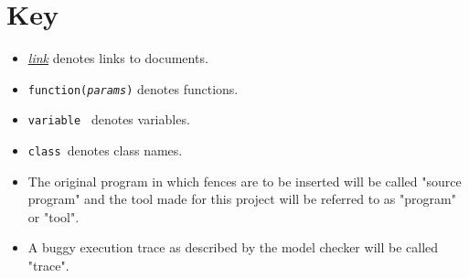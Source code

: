 \documentclass{article}
\newcommand{\var}[1]{\color{OliveGreen}\texttt{#1}\color{black}}
\newcommand{\fun}[2]{\color{Sepia}\texttt{#1(\color{Gray}\textit{#2}\color{Sepia})}\color{black}}
\newcommand{\class}[1]{\color{DarkOrchid}\texttt{#1}\color{black}}
\begin{document}
\section{Key}
\begin{itemize}
    \item \href{#4}{\textit{link}} denotes links to documents.
    \item \fun{function}{params} denotes functions.
    \item \var{variable } denotes variables.
    \item \class{class }denotes class names.
    \item The original program in which fences are to be inserted will be called "source program" and the tool made for this project will be referred to as "program" or "tool".
    \item A buggy execution trace as described by the model checker will be called "trace".
\end{itemize}
\end{document}
